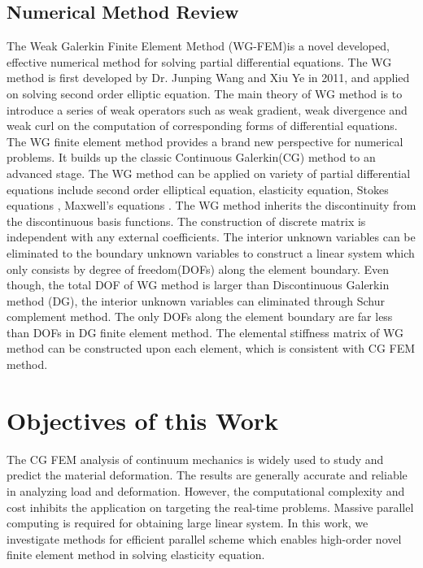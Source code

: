 \subsection{Numerical Method Review}

The Weak Galerkin Finite Element Method (WG-FEM)is a novel developed, effective numerical method for solving partial differential equations. The WG method is first developed by Dr. Junping Wang and Xiu Ye in 2011, and applied on solving second order elliptic equation\cite{wang2014weak}. The main theory of WG method is to introduce a series of weak operators such as weak gradient, weak divergence and weak curl on the computation of corresponding forms of differential equations. The WG finite element method provides a  brand new perspective for numerical problems. It builds up the classic Continuous Galerkin(CG) method to an advanced stage. The WG method can be applied on variety of partial differential equations include second order elliptical equation, elasticity equation\cite{wang2016locking}, Stokes equations \cite{wang2016weak}, Maxwell's equations \cite{mu2013weak}. The WG method inherits the discontinuity from the discontinuous basis functions. The construction of discrete matrix is independent with any external coefficients. The interior unknown variables can be eliminated to the boundary unknown variables to construct a linear system which only consists by degree of freedom(DOFs) along the element boundary. Even though, the total DOF of WG method is larger than Discontinuous Galerkin method (DG), the interior unknown variables can eliminated through Schur complement method. The only DOFs along the element boundary are far less than DOFs in DG finite element method. The elemental stiffness matrix of WG method can be constructed upon each element, which is consistent with CG FEM method. 

\section{Objectives of this Work}

The CG FEM analysis of continuum mechanics is widely used to study and predict the material deformation. The results are generally accurate and reliable in analyzing load and deformation. However, the computational complexity and cost inhibits the application on targeting the real-time problems. Massive parallel computing is required for obtaining large linear system. In this work, we investigate methods for efficient parallel scheme which enables high-order novel finite element method in solving elasticity equation.

